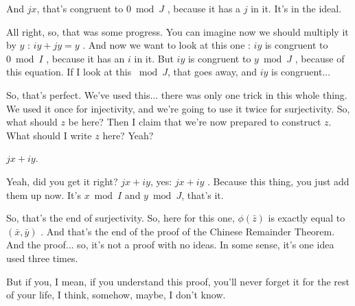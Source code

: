 \begin{proofWrapper}
\begin{speech}[00:11:15 - 00:12:57]
And $jx$, that's congruent to $0 \bmod J$ , because it has a $j$ in it. It's in the ideal.

All right, so, that was some progress. You can imagine now we should multiply it by $y$ : $iy + jy = y$ . And now we want to look at this one : $iy$ is congruent to $0 \bmod I$ , because it has an $i$ in it. But $iy$ is congruent to $y \bmod J$ , because of this equation. If I look at this $\bmod J$, that goes away, and $iy$ is congruent...

So, that's perfect. We've used this... there was only one trick in this whole thing. We used it once for injectivity, and we're going to use it twice for surjectivity. So, what should $z$ be here? Then I claim that we're now prepared to construct $z$. What should I write $z$ here? Yeah?
\end{speech}

\begin{student}
$jx + iy$.
\end{student}

\begin{speech}[00:12:59 - 00:13:45]
Yeah, did you get it right? $jx + iy$, yes: $jx + iy$ . Because this thing, you just add them up now. It's $x \bmod I$ and $y \bmod J$, that's it.

So, that's the end of surjectivity. So, here for this one, $\phi(\bar{z})$ is exactly equal to $(\bar{x}, \bar{y})$ . And that's the end of the proof of the Chinese Remainder Theorem. And the proof... so, it's not a proof with no ideas. In some sense, it's one idea used three times.

But if you, I mean, if you understand this proof, you'll never forget it for the rest of your life, I think, somehow, maybe, I don't know.
\end{speech}


\end{proofWrapper}

